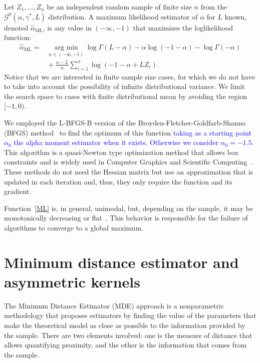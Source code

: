\documentclass[twocolumn]{svjour3}
\newcommand{\argmin}{\operatorname*{\text{arg min }}}
\begin{document}
	Let $Z_1,\dots, Z_n$ be an independent random sample of finite size $n$ from the $\mathcal G^0(\alpha,\gamma^*,L)$ distribution.
	A maximum likelihood estimator of $\alpha$ for $L$ known, denoted $\widehat\alpha_{\text{{ML}}}$, is any value in $(-\infty,-1)$ that maximizes the loglikelihood function:
	\begin{align}
		\hat{\alpha}_{\text{{ML}}}=&\argmin_{\alpha \in (-\infty,-1)}\log \Gamma(L-\alpha)-
		\alpha\log(-1-\alpha)-\log\Gamma(-\alpha) \nonumber \\
		&\mbox{}+\frac{\alpha-L}{n} \sum_{i=1}^n\log(-1-\alpha+L Z_i).
		\label{ML}
	\end{align}
	Notice that we are interested in finite sample size cases, for which we do not have to take into account the possibility of infinite distributional variance.
	We limit the search space to cases with finite distributional mean by avoiding the region $[-1,0)$.
	
	We employed the L-BFGS-B version of the Broyden-Fletcher-Goldfarb-Shanno (BFGS) method~\cite{Luenberger2008} to find the optimum of this function \textcolor{blue}{taking as a starting point $\alpha_0$ the alpha moment estimator when it exists. Otherwise we consider $\alpha_0=-1.5$}. This algorithm is a quasi-Newton type optimization method that allows box constraints and is widely used in Computer Graphics and Scientific Computing~\cite{FEI2014}. 
	These methods do not need the Hessian matrix but use an approximation that is updated in each iteration and, thus, they only require the function and its gradient. 
	
	Function~\eqref{ML} is, in general, unimodal, but, depending on the sample, it may be monotonically decreasing or flat~\cite{FreryCribariSouza:JASP:04}. 
	This behavior is responsible for the failure of algorithms to converge to a global maximum.
	
	
	\section{Minimum distance estimator and asymmetric kernels}
	\label{distancekernel}
	
	The Minimum Distance Estimator (MDE) approach is a nonparametric methodology that proposes estimators by finding the value of the parameters that make the theoretical model as close as possible to the information provided by the sample. 
	There are two elements involved: one is the measure of distance that allows quantifying proximity, and the other is the information that comes from the sample.
	
\end{document}

